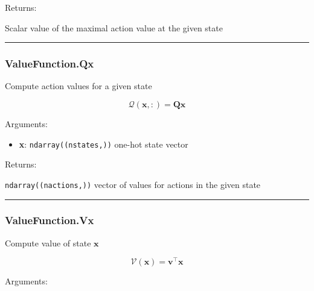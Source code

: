 Returns:

Scalar value of the maximal action value at the given state

\begin{center}\rule{0.5\linewidth}{\linethickness}\end{center}

\subsubsection{ValueFunction.Qx}\label{valuefunction.qx}

\begin{Shaded}
\begin{Highlighting}[]
\end{Highlighting}
\end{Shaded}

Compute action values for a given state

\[
\mathcal Q(\mathbf x, :) = \mathbf Q \mathbf x
\]

Arguments:

\begin{itemize}
\tightlist
\item
  \textbf{x}: \texttt{ndarray((nstates,))} one-hot state vector
\end{itemize}

Returns:

\texttt{ndarray((nactions,))} vector of values for actions in the given
state

\begin{center}\rule{0.5\linewidth}{\linethickness}\end{center}

\subsubsection{ValueFunction.Vx}\label{valuefunction.vx}

\begin{Shaded}
\begin{Highlighting}[]
\end{Highlighting}
\end{Shaded}

Compute value of state \(\mathbf x\)

\[
\mathcal V(\mathbf x) = \mathbf v^\top \mathbf x
\]

Arguments:

